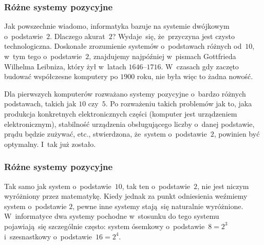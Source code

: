\documentclass[10pt,t]{beamer}
\begin{document}
\begin{frame}
  \frametitle{Różne systemy pozycyjne}



  Jak powszechnie wiadomo, informatyka bazuje na systemie dwójkowym
  o~podstawie~$2$. Dlaczego akurat~$2$? Wydaje~się, że~przyczyna jest
  czysto technologiczna. Doskonałe zrozumienie systemów o~podstawach
  różnych od~$10$, w~tym tego o~podstawie~$2$, znajdujemy najpóźniej
  w~pismach Gottfrieda Wilhelma Leibniza, który żył w~latach
  $1646\text{--}1716$. W~czasach gdy zaczęto budować współczesne komputery
  po $1900$ roku, nie była więc to żadna nowość.

  Dla pierwszych komputerów rozważano systemy pozycyjne o~bardzo różnych
  podstawach, takich jak $10$ czy~$5$. Po rozważeniu takich problemów jak
  to, jaka produkcja konkretnych elektronicznych części (komputer
  \alert{jest} urządzeniem elektronicznym), stabilność urządzenia
  obsługującego liczby o~danej podstawie, prądu będzie zużywać, etc.,
  stwierdzona, że~system o~podstawie~$2$, powinien być optymalny. I~tak już
  zostało.

\end{frame}





\begin{frame}
  \frametitle{Różne systemy pozycyjne}


  Tak samo jak system o~podstawie~$10$, tak ten o~podstawie~$2$, nie
  jest niczym wyróżniony przez matematykę. Kiedy jednak za punkt odniesienia
  weźmiemy system o~podstawie $2$, pewne inne systemy stają~się
  naturalnie wyróżnione. W~informatyce dwa systemy pochodne w~stosunku do
  tego systemu pojawiają~się szczególnie często: system ósemkowy
  o~podstawie~$8 = 2^{ 3 }$ i~szesnastkowy o~podstawie~$16 = 2^{ 4 }$.

\end{frame}
\end{document}
